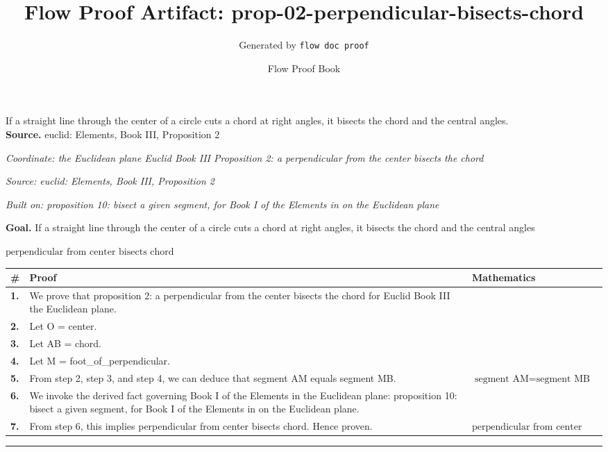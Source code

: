 \documentclass[11pt]{article}
\title{Flow Proof Artifact: prop-02-perpendicular-bisects-chord}
\author{Generated by \texttt{flow doc proof}}
\date{Flow Proof Book}
\theoremstyle{definition}
\begin{document}
\maketitle
If a straight line through the center of a circle cuts a chord at right angles, it bisects the chord and the central angles.\\[0.5em]
\textbf{Source.} euclid: Elements, Book III, Proposition 2\\[0.5em]
\bigskip
{}\par
\smallskip\noindent\textit{Coordinate: the Euclidean plane \cdot Euclid Book III \cdot Proposition 2: a perpendicular from the center bisects the chord}\par
\smallskip\noindent\textit{Source: euclid: Elements, Book III, Proposition 2}\par
\smallskip\noindent\textit{Built on: proposition 10: bisect a given segment, for Book I of the Elements in on the Euclidean plane}\par
\medskip
\noindent\textbf{Goal.} If a straight line through the center of a circle cuts a chord at right angles, it bisects the chord and the central angles\par
\noindent$\displaystyle \text{perpendicular from center bisects chord}$\par
\medskip
\noindent
\begin{tabular}{@{} >{\raggedright\arraybackslash}p{} >{\raggedright\arraybackslash}p{} >{\raggedleft\arraybackslash}p{} @{}}
\textbf{\#} & \textbf{Proof} & \textbf{Mathematics} \\
\midrule
\textbf{1.} & We prove that proposition 2: a perpendicular from the center bisects the chord for Euclid Book III the Euclidean plane. & \\[0.45em]
\textbf{2.} & Let O = center. & \\[0.45em]
\textbf{3.} & Let AB = chord. & \\[0.45em]
\textbf{4.} & Let M = foot\_of\_perpendicular. & \\[0.45em]
\textbf{5.} & From step 2, step 3, and step 4, we can deduce that segment AM equals segment MB. & $\displaystyle \text{segment AM} = \text{segment MB}$ \\[0.45em]
\textbf{6.} & We invoke the derived fact governing Book I of the Elements in the Euclidean plane: proposition 10: bisect a given segment, for Book I of the Elements in on the Euclidean plane. & \\[0.45em]
\textbf{7.} & From step 6, this implies perpendicular from center bisects chord. Hence proven. & $\displaystyle \text{perpendicular from center bisects chord}$ \\[0.45em]
\bottomrule
\end{tabular}
\label{thm:Geometry-Euclid Book III-proposition_2_a_perpendicular_from_the_center_bisects_the_chord}
\par\medskip\hrule
\end{document}
